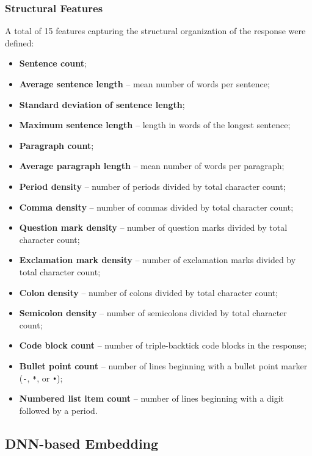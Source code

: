 \documentclass[a4paper,11pt,twoside]{report}
\theoremstyle{definition}
\begin{document}
\subsubsection{Structural Features}

A total of 15 features capturing the structural organization of the response were defined:

\begin{itemize}
    \item \textbf{Sentence count};
    \item \textbf{Average sentence length} -- mean number of words per sentence;
    \item \textbf{Standard deviation of sentence length};
    \item \textbf{Maximum sentence length} -- length in words of the longest sentence;
    \item \textbf{Paragraph count};
    \item \textbf{Average paragraph length} -- mean number of words per paragraph;
    \item \textbf{Period density} -- number of periods divided by total character count;
    \item \textbf{Comma density} -- number of commas divided by total character count;
    \item \textbf{Question mark density} -- number of question marks divided by total character count;
    \item \textbf{Exclamation mark density} -- number of exclamation marks divided by total character count;
    \item \textbf{Colon density} -- number of colons divided by total character count;
    \item \textbf{Semicolon density} -- number of semicolons divided by total character count;
    \item \textbf{Code block count} -- number of triple-backtick code blocks in the response;
    \item \textbf{Bullet point count} -- number of lines beginning with a bullet point marker (\texttt{-}, \texttt{*}, or \texttt{•});
    \item \textbf{Numbered list item count} -- number of lines beginning with a digit followed by a period.
\end{itemize}

\subsection{DNN-based Embedding}
\end{document}
